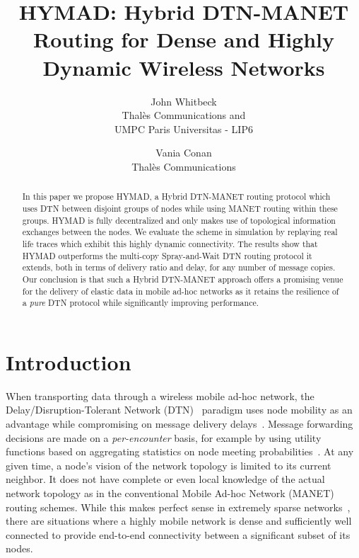 \documentclass[10pt,twocolumn,letterpaper]{article}
\begin{document}
\title{HYMAD: Hybrid DTN-MANET Routing for Dense and Highly Dynamic Wireless Networks}
\author{John Whitbeck \\
  Thal\`es Communications and \\
  UMPC Paris Universitas - LIP6
\and
Vania Conan \\
Thal\`es Communications
}

\maketitle
\thispagestyle{empty}

\begin{abstract}
  In this paper we propose HYMAD, a Hybrid DTN-MANET routing protocol
  which uses DTN between disjoint groups of nodes while using MANET
  routing within these groups. HYMAD is fully decentralized and only
  makes use of topological information exchanges between the nodes.
  We evaluate the scheme in simulation by replaying real life traces
  which exhibit this highly dynamic connectivity. The results show
  that HYMAD outperforms the multi-copy Spray-and-Wait DTN routing
  protocol it extends, both in terms of delivery ratio and delay, for
  any number of message copies.  Our conclusion is that such a Hybrid
  DTN-MANET approach offers a promising venue for the delivery of
  elastic data in mobile ad-hoc networks as it retains the resilience
  of a \textit{pure} DTN protocol while significantly improving
  performance.
\end{abstract}




\section{Introduction}
When transporting data through a wireless mobile ad-hoc network, the
Delay/Disruption-Tolerant Network (DTN)~\cite{dtn_fall_sigcomm}
paradigm uses node mobility as an advantage while compromising on
message delivery delays~\cite{GrossglauserTse2002}. Message forwarding
decisions are made on a \textit{per-encounter} basis, for example by
using utility functions based on aggregating statistics on node
meeting probabilities~\cite{lindgren03,daly07,LER}.  At any given
time, a node's vision of the network topology is limited to its
current neighbor. It does not have complete or even local knowledge of
the actual network topology as in the conventional Mobile Ad-hoc
Network (MANET) routing schemes. While this makes perfect sense in
extremely sparse networks~\cite{Burgess:2006,crawdad}, there are
situations where a highly mobile network is dense and sufficiently
well connected to provide end-to-end connectivity between a
significant subset of its nodes.
\end{document}
